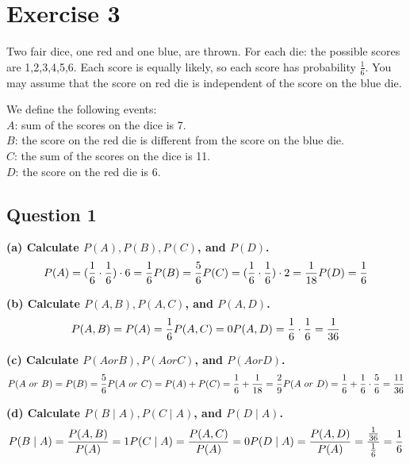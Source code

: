 \documentclass[
]{book}
\begin{document}
\chapter{Exercise 3}\label{exercise-3}

Two fair dice, one red and one blue, are thrown. For each die: the possible scores are 1,2,3,4,5,6. Each
score is equally likely, so each score has probability \(\frac{1}{6}\). You may assume that the score on red die is
independent of the score on the blue die.

We define the following events:\\
\(A\): sum of the scores on the dice is 7.\\
\(B\): the score on the red die is different from the score on the blue die.\\
\(C\): the sum of the scores on the dice is 11.\\
\(D\): the score on the red die is 6.\\

\section{Question 1}\label{question-1-1}

\textbf{(a) Calculate \(P(A), P(B), P(C)\), and \(P(D)\).}
\[P(A) = (\frac{1}{6} \cdot \frac{1}{6}) \cdot 6 = \frac{1}{6} \\
P(B) = \frac{5}{6} \\
P(C) = (\frac{1}{6} \cdot \frac{1}{6}) \cdot 2 = \frac{1}{18} \\
P(D) = \frac{1}{6}\]

\textbf{(b) Calculate \(P(A,B), P(A,C)\), and \(P(A,D)\).}
\[P(A,B) = P(A) = \frac{1}{6} \\
P(A,C) = 0 \\
P(A,D) = \frac{1}{6} \cdot \frac{1}{6} = \frac{1}{36}\]

\textbf{(c) Calculate \(P(A or B), P(A or C)\), and \(P(A or D)\).}
\[P(A \ or \ B) = P(B) = \frac{5}{6} \\
P(A \ or \  C) = P(A) + P(C) = \frac{1}{6} + \frac{1}{18} = \frac{2}{9} \\
P(A \ or \ D) = \frac{1}{6} + \frac{1}{6} \cdot \frac{5}{6} = \frac{11}{36}\]

\textbf{(d) Calculate \(P(B \mid A), P(C \mid A)\), and \(P(D \mid A)\).}
\[P(B \mid A) = \frac{P(A,B)}{P(A)} = 1 \\
P(C \mid A) = \frac{P(A,C)}{P(A)} = 0 \\
P(D \mid A) = \frac{P(A,D)}{P(A)} = \frac{\frac{1}{36}}{\frac{1}{6}} = \frac{1}{6}\]
\end{document}
